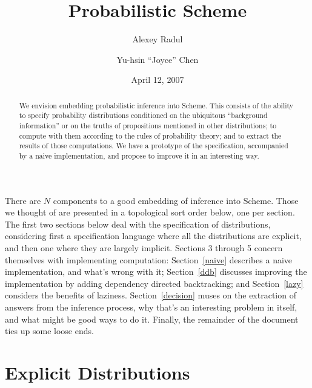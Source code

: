 \documentclass[12pt]{article}
\title{Probabilistic Scheme}
\author{Alexey Radul \and Yu-hsin ``Joyce'' Chen}
\date{April 12, 2007}
\begin{document}
\maketitle

\begin{abstract}
We envision embedding probabilistic inference into Scheme.  This
consists of the ability to specify probability distributions
conditioned on the ubiquitous ``background information'' or on the
truths of propositions mentioned in other distributions; to compute
with them according to the rules of probability theory; and to extract
the results of those computations.  We have a prototype of the 
specification, accompanied by a naive implementation, and propose
to improve it in an interesting way.
\end{abstract}

There are $N$ components to a good embedding of inference into Scheme.
Those we thought of are presented in a topological sort order below,
one per section.
The first two sections below deal with the specification of
distributions, considering first a specification language where all
the distributions are explicit, and then one where they are largely
implicit.  Sections 3 through 5 concern themselves with implementing
computation: Section~\ref{naive} describes a naive implementation, and
what's wrong with it; Section~\ref{ddb} discusses improving the
implementation by adding dependency directed backtracking; and
Section~\ref{lazy} considers the benefits of laziness.
Section~\ref{decision} muses on the extraction of answers from the
inference process, why that's an interesting problem in itself, and
what might be good ways to do it.  Finally, the remainder of the
document ties up some loose ends.

\section{Explicit Distributions}
\label{explicit}
\end{document}

